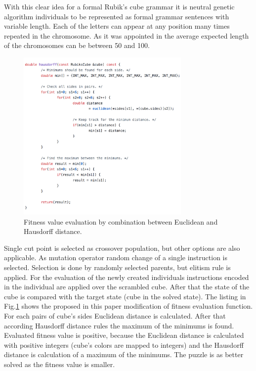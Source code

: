 \documentclass[runningheads]{llncs}
\begin{document}
With this clear idea for a formal Rubik's cube grammar it is neutral genetic algorithm individuals to be represented as formal grammar sentences with variable length. Each of the letters can appear at any position many times repeated in the chromosome. As it was appointed in \cite{korf01} the average expected length of the chromosomes can be between 50 and 100.

\begin{figure}
\includegraphics[width=0.75\textwidth]{fig01.png}
\centering
\caption{Fitness value evaluation by combination between Euclidean and Hausdorff distance.} \label{fig01}
\end{figure}
\FloatBarrier

Single cut point is selected as crossover population, but other options \cite{poli01} are also applicable. As mutation operator random change of a single instruction is selected. Selection is done by randomly selected parents, but elitism rule is applied. For the evaluation of the newly created individuals instructions encoded in the individual are applied over the scrambled cube. After that the state of the cube is compared with the target state (cube in the solved state). The listing in Fig.\ref{fig01} shows the proposed in this paper modification of fitness evaluation function. For each pairs of cube's sides Euclidean distance is calculated. After that according Hausdorff distance rules the maximum of the minimums is found. Evaluated fitness value is positive, because the Euclidean distance is calculated with positive integers (cube's colors are mapped to integers) and the Hausdorff distance is calculation of a maximum of the minimums. The puzzle is as better solved as the fitness value is smaller. 
\end{document}
